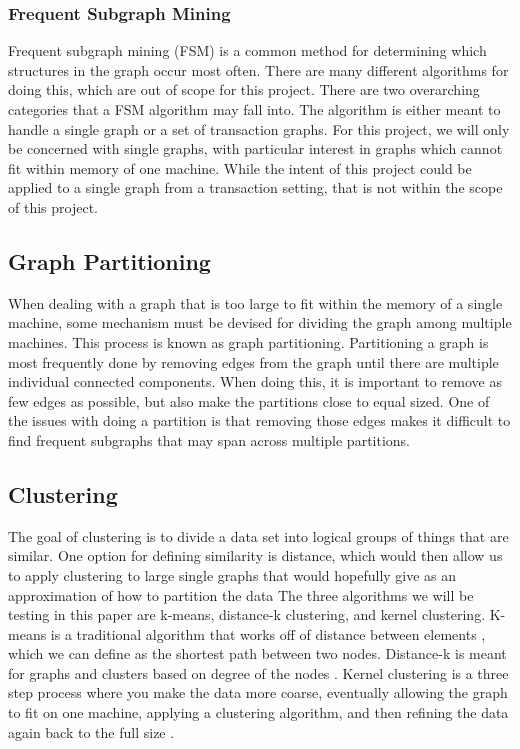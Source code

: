 \documentclass[12pt]{article}
\begin{document}
\subsubsection{Frequent Subgraph Mining}
Frequent subgraph mining (FSM) is a common method for determining which structures in the graph occur most often. There are many different algorithms for doing this, which are out of scope for this project.
\newline\newline
There are two overarching categories that a FSM algorithm may fall into. The algorithm is either meant to handle a single graph or a set of transaction graphs. For this project, we will only be concerned with single graphs, with particular interest in graphs which cannot fit within memory of one machine. While the intent of this project could be applied to a single graph from a transaction setting, that is not within the scope of this project.

\subsection{Graph Partitioning}
When dealing with a graph that is too large to fit within the memory of a single machine, some mechanism must be devised for dividing the graph among multiple machines. This process is known as graph partitioning.
\newline\newline
Partitioning a graph is most frequently done by removing edges from the graph until there are multiple individual connected components. When doing this, it is important to remove as few edges as possible, but also make the partitions close to equal sized. One of the issues with doing a partition is that removing those edges makes it difficult to find frequent subgraphs that may span across multiple partitions.

\subsection{Clustering}
The goal of clustering is to divide a data set into logical groups of things that are similar. One option for defining similarity is distance, which would then allow us to apply clustering to large single graphs that would hopefully give as an approximation of how to partition the data
\newline\newline
The three algorithms we will be testing in this paper are k-means, distance-k clustering, and kernel clustering. K-means is a traditional algorithm that works off of distance between elements \cite{kmeans}, which we can define as the shortest path between two nodes. Distance-k is meant for graphs and clusters based on degree of the nodes \cite{distK}. Kernel clustering is a three step process where you make the data more coarse, eventually allowing the graph to fit on one machine, applying a clustering algorithm, and then refining the data again back to the full size \cite{kernel}.
\end{document}
